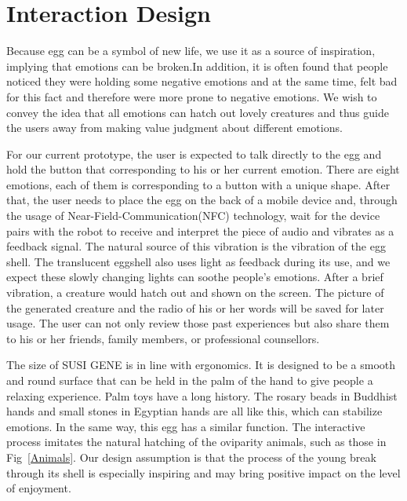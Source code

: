 \documentclass[manuscript,screen]{acmart}
\begin{document}
\section{Interaction Design}

Because egg can be a symbol of new life, we use it as a source of inspiration, implying that emotions can be broken.In addition, it is often found that people noticed they were holding some negative emotions and at the same time, felt bad for this fact and therefore were more prone to negative emotions. We wish to convey the idea that all emotions can hatch out lovely creatures and thus guide the users away from making value judgment about different emotions.

For our current prototype, the user is expected to talk directly to the egg and hold the button that corresponding to his or her current emotion. There are eight emotions, each of them is corresponding to a button with a unique shape. After that, the user needs to place the egg on the back of a mobile device and, through the usage of Near-Field-Communication(NFC) technology, wait for the device pairs with the robot to receive and interpret the piece of audio and vibrates as a feedback signal. The natural source of this vibration is the vibration of the egg shell. The translucent eggshell also uses light as feedback during its use, and we expect these slowly changing lights can soothe people's emotions. After a brief vibration, a creature would hatch out and shown on the screen. The picture of the generated creature and the radio of his or her words will be saved for later usage. The user can not only review those past experiences but also share them to his or her friends, family members, or professional counsellors.

The size of SUSI GENE is in line with ergonomics. It is designed to be a smooth and round surface that can be held in the palm of the hand to give people a relaxing experience. Palm toys have a long history. The rosary beads in Buddhist hands and small stones in Egyptian hands are all like this, which can stabilize emotions. In the same way, this egg has a similar function. The interactive process imitates the natural hatching of the oviparity animals, such as those in Fig~\ref{Animals}. Our design assumption is that the process of the young break through its shell is especially inspiring and may bring positive impact on the level of enjoyment.\cite{nezlek2008regulating}
\end{document}
